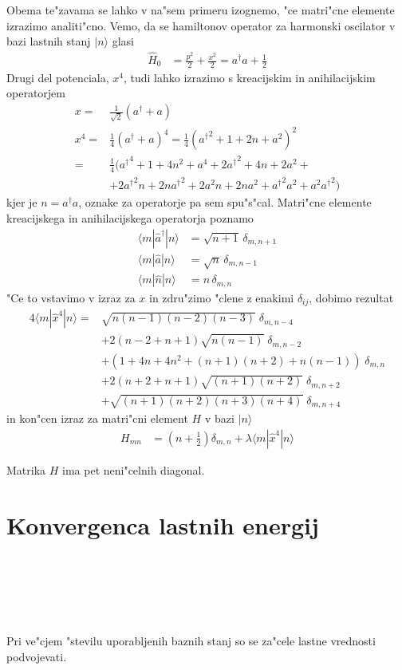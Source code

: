 \documentclass[a4paper,10pt]{article}
\begin{document}
Obema te"zavama se lahko v na"sem primeru izognemo, "ce matri"cne elemente izrazimo analiti"cno. Vemo, da se hamiltonov operator za harmonski oscilator v bazi lastnih stanj $|n\rangle$ glasi
\begin{align}
  \hat H_0 &= \frac{p^2}{2} + \frac{x^2}{2} = a^\dagger a + \frac{1}{2}
\end{align}
Drugi del potenciala, $x^4$, tudi lahko izrazimo s kreacijskim in anihilacijskim operatorjem
\begin{align}
  x = & {} \frac{1}{\sqrt{2}} (a^\dagger + a) \\
  x^4 = & {} \frac{1}{4} (a^\dagger + a)^4 = \frac{1}{4} \left({a^\dagger}^2 + 1 + 2n + a^2\right)^2 \\
      = & {} \frac{1}{4} \Big( {a^\dagger}^4 + 1 + 4n^2 + a^4 + 2{a^\dagger}^2 + 4n + 2a^2 + \\
      &+ 2{a^\dagger}^2n + 2n{a^\dagger}^2 + 2{a}^2n + 2n{a}^2 + {a^\dagger}^2a^2 + a^2{a^\dagger}^2\Big)
\end{align}
kjer je $n=a^\dagger a$, oznake za operatorje pa sem spu"s"cal. Matri"cne elemente kreacijskega in anihilacijskega operatorja poznamo
\begin{align}
  \langle m|\hat a^\dagger|n\rangle &= \sqrt{n+1}\,\delta_{m,n+1}\\
  \langle m|\hat a|n\rangle &= \sqrt{n}\,\delta_{m,n-1} \\ 
  \langle m|\hat n|n\rangle &= n\,\delta_{m,n} 
\end{align}
"Ce to vstavimo v izraz za $x$ in zdru"zimo "clene z enakimi $\delta_{ij}$, dobimo rezultat
\begin{align}
  4\langle m|\hat x^4|n\rangle = & {} \sqrt{n(n-1)(n-2)(n-3)} \; \delta_{m,n-4} \\
  & + 2(n-2 + n + 1)\sqrt{n(n-1)} \; \delta_{m,n-2} \\
  & + (1 + 4n + 4n^2 + (n+1)(n+2) + n(n-1)) \; \delta_{m,n} \\
  & + 2(n+2 + n + 1)\sqrt{(n+1)(n+2)} \; \delta_{m,n+2} \\
  & + \sqrt{(n+1)(n+2)(n+3)(n+4)} \; \delta_{m,n+4}
\end{align}
in kon"cen izraz za matri"cni element $H$ v bazi $|n\rangle$
\begin{align}
  H_{mn} &= \left(n+\frac{1}{2}\right) \delta_{m,n} + \lambda\langle m|\hat x^4|n\rangle
\end{align}

Matrika $H$ ima pet neni"celnih diagonal. 


\section{Konvergenca lastnih energij}

 \\
 \\
 \\
 \\
 \\

Pri ve"cjem "stevilu uporabljenih baznih stanj so se za"cele lastne vrednosti podvojevati. 
\end{document}
